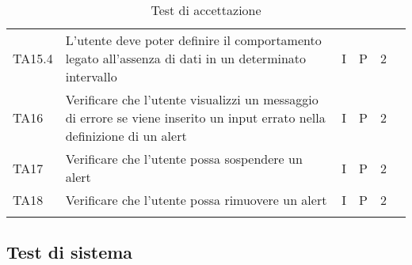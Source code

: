 \begin{longtable} {
	>{}p{12mm}
	>{}p{79.5mm}
	>{}p{9mm}
	>{}p{8mm}
	>{}p{14mm}
	>{}p{0mm}}
	TA15.4 & L'utente deve poter definire il comportamento legato all'assenza di dati in un determinato intervallo & I & P & 2 & \TBstrut \\ [2mm]
	TA16 & Verificare che l'utente visualizzi un messaggio di errore se viene inserito un input errato nella definizione di un alert\glo & I & P & 2 & \TBstrut \\ [2mm]
	TA17 & Verificare che l'utente possa sospendere un alert\glo & I & P & 2 & \TBstrut \\ [2mm]
	TA18 & Verificare che l'utente possa rimuovere un alert\glo & I & P & 2 & \TBstrut \\ [2mm]
	\rowcolor{white}
	\caption{Test di accettazione}
\end{longtable}


\subsection{Test di sistema}

